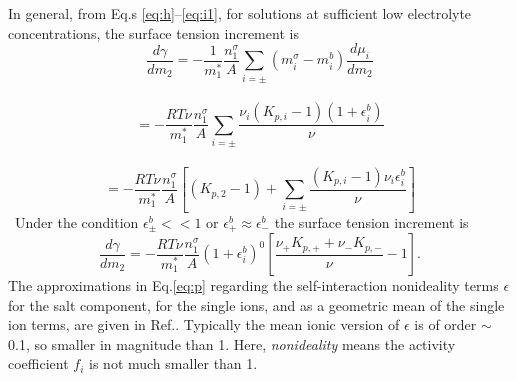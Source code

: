 In general, from Eq.s \thinspace\ref{eq:h}--\thinspace\ref{eq:i1}, for solutions at sufficient low electrolyte concentrations, the surface tension increment is 
\begin{equation}
\frac{d\gamma}{dm_2} = -\frac{1}{m_1^*}\frac{n_1^{\sigma}}{A}\sum_{i=\pm}(m_i^{\sigma} -m_{i}^{b})\frac{d\mu_i}{dm_2} \nonumber
\label{eq:gamma_m2}
\end{equation}\
\begin{equation}
= -\frac{RT\nu}{m_1^*}\frac{n_1^{\sigma}}{A}\sum_{i=\pm} \frac{{\nu_i}(K_{p,i}-1)(1+\epsilon_i^b)}{\nu} \nonumber
\label{eq:l}
\end{equation}\
\begin{equation}
= -\frac{RT\nu}{m_1^*}\frac{n_1^{\sigma}}{A}[(K_{p,2}-1)+\sum_{i=\pm} \frac{(K_{p,i}-1)\nu_i\epsilon_i^b}{\nu}]
\label{eq:n}
\end{equation}\
Under the condition $\epsilon_{\pm}^b << 1$ or $\epsilon_{+}^b \approx \epsilon_{-}^b$
the surface tension increment is 
\begin{equation}
\frac{d\gamma}{dm_2} 
= -\frac{RT\nu}{m_1^*}\frac{n_1^{\sigma}}{A} (1+\epsilon_i^b)^0 [\frac{\nu_+ K_{p,+} + \nu_- K_{p,-}}{\nu}-1].
\label{eq:p}
\end{equation}
The approximations in Eq.\thinspace\ref{eq:p} regarding the self-interaction {nonideality terms} $\epsilon$ for the salt component, 
for the single ions, and as a geometric mean of the single ion terms, are given in Ref.\cite{Pegram2006}.  
Typically the mean ionic version of $\epsilon$ is of order $\sim$ 0.1, so smaller in magnitude than 1. %
Here, \emph{nonideality} means the activity coefficient $f_i$ is not much smaller than 1.
%
%
%
%


